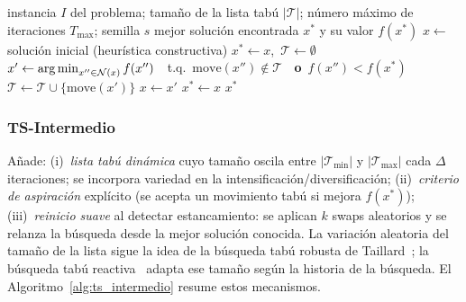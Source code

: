 \begin{algorithm}[t]
\caption{TS-Básico}\label{alg:ts_basico}
\begin{algorithmic}[1]
  \Require instancia $I$ del problema; tamaño de la lista tabú
           $|\mathcal{T}|$; número máximo de iteraciones $T_{\max}$;
           semilla $s$
  \Ensure mejor solución encontrada $x^*$ y su valor $f(x^*)$
  \State $x \leftarrow$ solución inicial (heurística constructiva)
  \State $x^* \leftarrow x$,\ $\mathcal{T} \leftarrow \emptyset$
    \State $x' \leftarrow \operatorname*{arg\,min}_{x'' \in \mathcal{N}(x)} f(x'')$
           $\;$ t.q.\ $\text{move}(x'') \notin \mathcal{T}$
           $\;$ \textbf{o}\ $f(x'') < f(x^*)$
    \State $\mathcal{T} \leftarrow \mathcal{T} \cup \{\text{move}(x')\}$
    \State $x \leftarrow x'$
     $x^* \leftarrow x$ \EndIf
  \EndFor
  \State \Return $x^*$
\end{algorithmic}
\end{algorithm}

\subsubsection{TS-Intermedio}
Añade: (i)~\emph{lista tabú dinámica} cuyo tamaño oscila entre
$|\mathcal{T}_{\min}|$ y $|\mathcal{T}_{\max}|$ cada $\Delta$ iteraciones;
se incorpora variedad en la intensificación/diversificación;
(ii)~\emph{criterio de aspiración} explícito (se acepta un movimiento tabú
si mejora $f(x^*)$); (iii)~\emph{reinicio suave} al detectar estancamiento:
se aplican $k$ swaps aleatorios y se relanza la búsqueda desde la mejor
solución conocida.
La variación aleatoria del tamaño de la lista sigue la idea de la búsqueda
tabú robusta de Taillard~\cite{taillard1991robust}; la búsqueda tabú
reactiva~\cite{battiti1994reactive} adapta ese tamaño según la historia
de la búsqueda.
El Algoritmo~\ref{alg:ts_intermedio} resume estos mecanismos.

